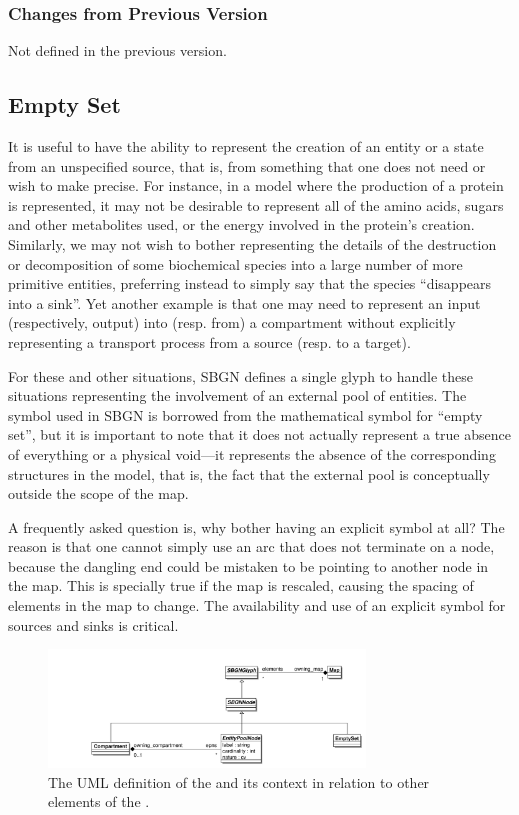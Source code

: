 \subsubsection{Changes from Previous Version}

Not defined in the previous version.

\subsection{Empty Set}
\label{sec:sourceSink}

It is useful to have the ability to represent the creation of an entity or
a state from an unspecified source, that is, from something that one does
not need or wish to make precise.  For instance, in a model where the
production of a protein is represented, it may not be desirable to
represent all of the amino acids, sugars and other metabolites used, or the
energy involved in the protein's creation.  Similarly, we may not wish to
bother representing the details of the destruction or decomposition of some
biochemical species into a large number of more primitive entities,
preferring instead to simply say that the species ``disappears into a
sink''.  Yet another example is that one may need to represent an input
(respectively, output) into (resp. from) a compartment without explicitly
representing a transport process from a source (resp. to a target).

For these and other situations, SBGN defines a single glyph to handle
these situations representing the involvement of an external pool of entities.  The symbol
used in SBGN is borrowed from the mathematical symbol for ``empty set'',
but it is important to note that it does not actually represent a true
absence of everything or a physical void---it represents the absence of the
corresponding structures in the model, that is, the fact that the
external pool is conceptually outside the scope of the map.

A frequently asked question is, why bother having an explicit symbol at
all?  The reason is that one cannot simply use an arc that does not
terminate on a node, because the dangling end could be mistaken to be
pointing to another node in the map.  This is specially true if the
map is rescaled, causing the spacing of elements in the map to
change.  The availability and use of an explicit symbol for sources and
sinks is critical.

\begin{figure}[htb]
  \centering
  \includegraphics[width=0.75\textwidth]{images/emptysetuml}
  \caption{The UML definition of the  and its context
    in relation to other elements of the \PDl.}
  \label{fig:emptysetuml}
\end{figure}

